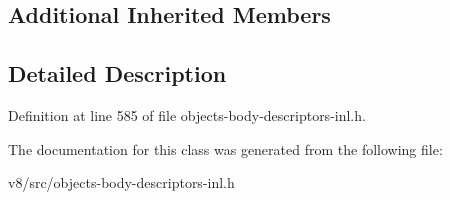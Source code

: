 \subsection*{Additional Inherited Members}


\subsection{Detailed Description}


Definition at line 585 of file objects-\/body-\/descriptors-\/inl.\+h.



The documentation for this class was generated from the following file\+:\begin{DoxyCompactItemize}
\item 
v8/src/objects-\/body-\/descriptors-\/inl.\+h\end{DoxyCompactItemize}
